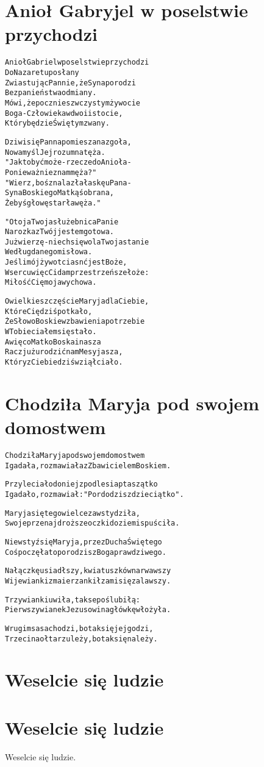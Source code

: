 \documentclass[a4paper,12pt]{article}
\begin{document}
\section*{Anioł Gabryjel w poselstwie przychodzi}

\begin{alltt}
Anioł Gabriel w poselstwie przychodzi 
Do Nazaretu posłany
Zwiastując Pannie, że Syna porodzi 
Bez panieństwa odmiany.
Mówi, że poczniesz w czystym żywocie 
Boga-Człowieka w dwoi istocie,
Który będzie Świętym zwany.

Dziwi się Panna pomieszana zgoła,
Nowa myśl Jej rozum natęża.
"Jak to być może - rzecze do Anioła - 
Ponieważ nie znam męża?"
"Wierz, boś znalazła łaskę u Pana - 
Syna Boskiego Matkąś obrana,
Żebyś głowę starła węża."

"Oto ja Twoja służebnica Panie 
Na rozkaz Twój jestem gotowa.
Już wierzę - niech się wola Twoja stanie 
Według danego mi słowa.
Jeśli mój żywot ciasnć jest Boże, 
W sercu więc Ci dam przestrzeńsze łoże:
Miłość Cię moja wychowa.

O wielkie szczęście Maryja dla Ciebie, 
Które Cię dziś potkało,
Że Słowo Boskie w zbawienia potrzebie 
W Tobie ciałem się stało.
A więc o Matko Boska i nasza 
Racz już urodzić nam Mesyjasza,
Który z Ciebie dziś wziął ciało.
\end{alltt}
\newpage

\section*{Chodziła Maryja pod swojem domostwem}
\begin{alltt}
Chodziła Maryja pod swojem domostwem
I gadała, rozmawiała z Zbawicielem Boskiem.

Przyleciało do niej z podlesia ptaszątko
I gadało, rozmawiał: "Pordodzisz dzieciątko".

Maryja się tego wielce zawstydziła,
Swoje przenajdroższe oczki do ziemi spuściła.

Nie wstyź się Maryja, prze z Ducha Świętego
Coś poczęła to porodzisz Boga prawdziwego.

Na łączkę usiadłszy, kwiatuszków narwawszy
Wije wianki z maierzanki łzami się zalawszy.

Trzy wianki uwiła, tak se poślubiłą:
Pierwszy wianek Jezusowi na główkę włożyła.

W rugim sasa chodzi, bo tak się jej godzi, 
Trzeci na ołtarzu leży, bo tak się należy.

\end{alltt}
\newpage

\section*{Weselcie się ludzie}
\begin{alltt}
\end{alltt}
\newpage

\section*{Weselcie się ludzie}
Weselcie się ludzie.
\newpage
\end{document}
